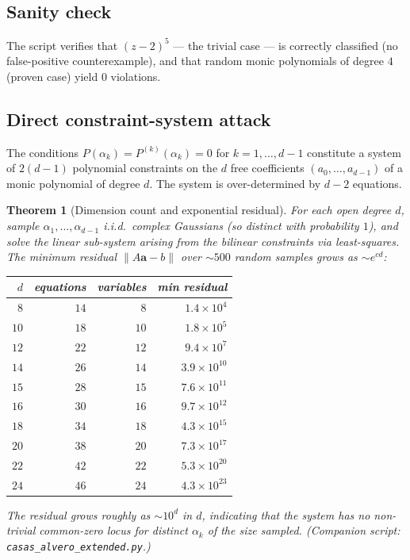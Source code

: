 \documentclass[11pt,a4paper]{article}
\newtheorem{theorem}{Theorem}[section]
\begin{document}
\subsection{Sanity check}
The script verifies that $(z - 2)^5$ — the trivial case — is correctly classified (no false-positive counterexample), and that random monic polynomials of degree $4$ (proven case) yield $0$ violations.

\subsection{Direct constraint-system attack}\label{sec:dimcount}

The conditions $P(\alpha_k) = P^{(k)}(\alpha_k) = 0$ for $k = 1, \ldots, d-1$
constitute a system of $2(d-1)$ polynomial constraints on the $d$
free coefficients $(a_0, \ldots, a_{d-1})$ of a monic polynomial of
degree $d$. The system is over-determined by $d - 2$ equations.

\begin{theorem}[Dimension count and exponential residual]\label{thm:dimension}
For each open degree $d$, sample $\alpha_1, \ldots, \alpha_{d-1}$ i.i.d.\
complex Gaussians (so distinct with probability $1$), and solve the linear
sub-system arising from the bilinear constraints via least-squares.
The minimum residual $\|A\mathbf{a} - b\|$ over $\sim 500$ random samples
grows as $\sim e^{cd}$:

\begin{center}
\begin{tabular}{rrrr}
\toprule
$d$ & equations & variables & min residual \\
\midrule
$8$  & $14$ & $8$  & $1.4 \times 10^{4}$ \\
$10$ & $18$ & $10$ & $1.8 \times 10^{5}$ \\
$12$ & $22$ & $12$ & $9.4 \times 10^{7}$ \\
$14$ & $26$ & $14$ & $3.9 \times 10^{10}$ \\
$15$ & $28$ & $15$ & $7.6 \times 10^{11}$ \\
$16$ & $30$ & $16$ & $9.7 \times 10^{12}$ \\
$18$ & $34$ & $18$ & $4.3 \times 10^{15}$ \\
$20$ & $38$ & $20$ & $7.3 \times 10^{17}$ \\
$22$ & $42$ & $22$ & $5.3 \times 10^{20}$ \\
$24$ & $46$ & $24$ & $4.3 \times 10^{23}$ \\
\bottomrule
\end{tabular}
\end{center}

\noindent The residual grows roughly as $\sim 10^{d}$ in $d$, indicating that
the system has \emph{no} non-trivial common-zero locus for distinct $\alpha_k$
of the size sampled. (Companion script: \texttt{casas\_alvero\_extended.py}.)
\end{theorem}
\end{document}
